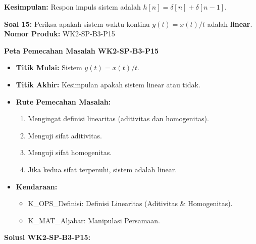 \documentclass[
  letterpaper,
  DIV=11,
  numbers=noendperiod]{scrreprt}
\providecommand{\tightlist}{%
  \setlength{\itemsep}{0pt}\setlength{\parskip}{0pt}}
\begin{document}
\textbf{Kesimpulan:} Respon impuls sistem adalah
\textbf{\(h[n] = \delta[n] + \delta[n-1]\)}.

\textbf{Soal 15:} Periksa apakah sistem waktu kontinu \(y(t) = x(t)/t\)
adalah \textbf{linear}. \textbf{Nomor Produk:} WK2-SP-B3-P15

\textbf{Peta Pemecahan Masalah WK2-SP-B3-P15}

\begin{itemize}
\tightlist
\item
  \textbf{Titik Mulai:} Sistem \(y(t) = x(t)/t\).
\item
  \textbf{Titik Akhir:} Kesimpulan apakah sistem linear atau tidak.
\item
  \textbf{Rute Pemecahan Masalah:}

  \begin{enumerate}
  \def\labelenumi{\arabic{enumi}.}
  \tightlist
  \item
    Mengingat definisi linearitas (aditivitas dan homogenitas).
  \item
    Menguji sifat aditivitas.
  \item
    Menguji sifat homogenitas.
  \item
    Jika kedua sifat terpenuhi, sistem adalah linear.
  \end{enumerate}
\item
  \textbf{Kendaraan:}

  \begin{itemize}
  \tightlist
  \item
    K\_OPS\_Definisi: Definisi Linearitas (Aditivitas \& Homogenitas).
  \item
    K\_MAT\_Aljabar: Manipulasi Persamaan.
  \end{itemize}
\end{itemize}

\textbf{Solusi WK2-SP-B3-P15:}
\end{document}
